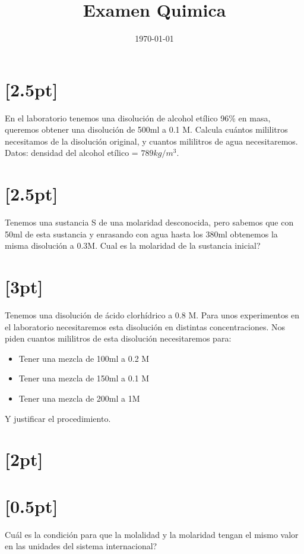 \documentclass[11pt]{article}
\date{\today}
\title{Examen Quimica}
\begin{document}
\maketitle
\section{[2.5pt]}
\label{sec:org220dcd1}
En el laboratorio tenemos una disolución de alcohol etílico 96\% en masa, queremos obtener una disolución de 500ml a 0.1 M. Calcula cuántos mililitros necesitamos de la disolución original, y cuantos mililitros de agua necesitaremos. \\
Datos: densidad del alcohol etílico = \(789kg/m^{3}\).

\section{[2.5pt]}
\label{sec:org466d254}
Tenemos una sustancia S de una molaridad desconocida, pero sabemos que con 50ml de esta sustancia y enrasando con agua hasta los 380ml obtenemos la misma disolución a 0.3M. Cual es la molaridad de la sustancia inicial?

\section{[3pt]}
\label{sec:orgdb42b92}
Tenemos una disolución de ácido clorhídrico a 0.8 M. Para unos experimentos en el laboratorio necesitaremos esta disolución en distintas concentraciones. Nos piden cuantos mililitros de esta disolución necesitaremos para:
\begin{itemize}
\item Tener una mezcla de 100ml a 0.2 M
\item Tener una mezcla de 150ml a 0.1 M
\item Tener una mezcla de 200ml a 1M
\end{itemize}
Y justificar el procedimiento.

\section{[2pt]}
\label{sec:org95229f3}

\section{[0.5pt]}
\label{sec:orgcf73277}
Cuál es la condición para que la molalidad y la molaridad tengan el mismo valor en las unidades del sistema internacional?
\end{document}
